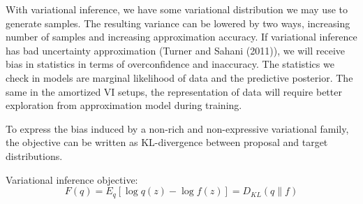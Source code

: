 \documentclass{article}
\begin{document}

With variational inference, we have some variational distribution we may use to generate samples. The resulting variance can be lowered by two ways, increasing number of samples and increasing approximation accuracy.
If variational inference has bad uncertainty approximation (Turner and Sahani (2011)), we will receive bias in statistics in terms of overconfidence and inaccuracy. 
The statistics we check in models are marginal likelihood of data and the predictive posterior. 
The same in the amortized VI setups, the representation of data will require better exploration from approximation model during training.

To express the bias induced by a non-rich and non-expressive variational family, the objective can be written as KL-divergence between proposal and target distributions.

Variational inference objective:
\begin{equation*}
    F(q) = E_q[\log q(z) - \log f(z)] = D_{KL}(q\|f)
\end{equation*}
\end{document}
